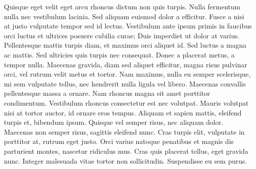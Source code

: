 \documentclass[a4paper]{article}
\begin{document}
    \begin{answer}
        Quisque eget velit eget arcu rhoncus dictum non quis turpis. Nulla fermentum nulla nec vestibulum lacinia. Sed aliquam euismod dolor a efficitur. Fusce a nisi at justo vulputate tempor sed id lectus. Vestibulum ante ipsum primis in faucibus orci luctus et ultrices posuere cubilia curae; Duis imperdiet ut dolor at varius. Pellentesque mattis turpis diam, et maximus orci aliquet id. Sed luctus a magna ac mattis. Sed ultricies quis turpis nec consequat. Donec a placerat metus, a tempor nulla. Maecenas gravida, diam sed aliquet efficitur, magna risus pulvinar orci, vel rutrum velit metus et tortor. Nam maximus, nulla eu semper scelerisque, mi sem vulputate tellus, nec hendrerit nulla ligula vel libero. Maecenas convallis pellentesque massa a ornare.
        Nam rhoncus magna sit amet porttitor condimentum. Vestibulum rhoncus consectetur est nec volutpat. Mauris volutpat nisi at tortor auctor, id ornare eros tempus. Aliquam et sapien mattis, eleifend turpis et, bibendum ipsum. Quisque vel semper risus, nec aliquam dolor. Maecenas non semper risus, sagittis eleifend nunc. Cras turpis elit, vulputate in porttitor at, rutrum eget justo. Orci varius natoque penatibus et magnis dis parturient montes, nascetur ridiculus mus. Cras quis placerat tellus, eget gravida nunc. Integer malesuada vitae tortor non sollicitudin. Suspendisse eu sem purus.
    \end{answer}
\end{document}
